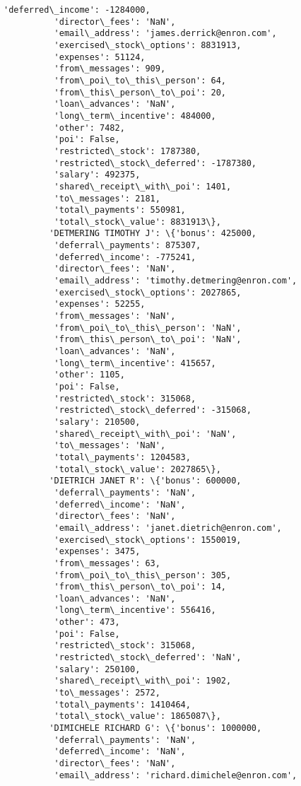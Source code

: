 \documentclass[11pt]{article}
\begin{document}
\begin{Verbatim}[commandchars=\\\{\}]
          'deferred\_income': -1284000,
          'director\_fees': 'NaN',
          'email\_address': 'james.derrick@enron.com',
          'exercised\_stock\_options': 8831913,
          'expenses': 51124,
          'from\_messages': 909,
          'from\_poi\_to\_this\_person': 64,
          'from\_this\_person\_to\_poi': 20,
          'loan\_advances': 'NaN',
          'long\_term\_incentive': 484000,
          'other': 7482,
          'poi': False,
          'restricted\_stock': 1787380,
          'restricted\_stock\_deferred': -1787380,
          'salary': 492375,
          'shared\_receipt\_with\_poi': 1401,
          'to\_messages': 2181,
          'total\_payments': 550981,
          'total\_stock\_value': 8831913\},
         'DETMERING TIMOTHY J': \{'bonus': 425000,
          'deferral\_payments': 875307,
          'deferred\_income': -775241,
          'director\_fees': 'NaN',
          'email\_address': 'timothy.detmering@enron.com',
          'exercised\_stock\_options': 2027865,
          'expenses': 52255,
          'from\_messages': 'NaN',
          'from\_poi\_to\_this\_person': 'NaN',
          'from\_this\_person\_to\_poi': 'NaN',
          'loan\_advances': 'NaN',
          'long\_term\_incentive': 415657,
          'other': 1105,
          'poi': False,
          'restricted\_stock': 315068,
          'restricted\_stock\_deferred': -315068,
          'salary': 210500,
          'shared\_receipt\_with\_poi': 'NaN',
          'to\_messages': 'NaN',
          'total\_payments': 1204583,
          'total\_stock\_value': 2027865\},
         'DIETRICH JANET R': \{'bonus': 600000,
          'deferral\_payments': 'NaN',
          'deferred\_income': 'NaN',
          'director\_fees': 'NaN',
          'email\_address': 'janet.dietrich@enron.com',
          'exercised\_stock\_options': 1550019,
          'expenses': 3475,
          'from\_messages': 63,
          'from\_poi\_to\_this\_person': 305,
          'from\_this\_person\_to\_poi': 14,
          'loan\_advances': 'NaN',
          'long\_term\_incentive': 556416,
          'other': 473,
          'poi': False,
          'restricted\_stock': 315068,
          'restricted\_stock\_deferred': 'NaN',
          'salary': 250100,
          'shared\_receipt\_with\_poi': 1902,
          'to\_messages': 2572,
          'total\_payments': 1410464,
          'total\_stock\_value': 1865087\},
         'DIMICHELE RICHARD G': \{'bonus': 1000000,
          'deferral\_payments': 'NaN',
          'deferred\_income': 'NaN',
          'director\_fees': 'NaN',
          'email\_address': 'richard.dimichele@enron.com',

\end{Verbatim}
\end{document}
